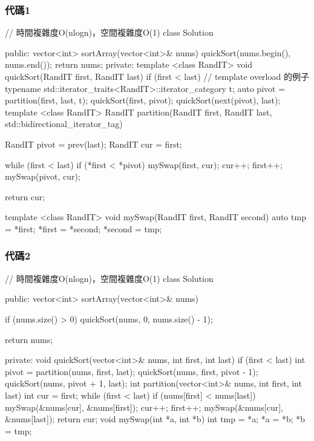\subsubsection{代碼1}
\begin{Code}
// 時間複雜度O(nlogn)，空間複雜度O(1)
class Solution {
public:
    vector<int> sortArray(vector<int>& nums) {
        quickSort(nums.begin(), nums.end());
        return nums;
    }
private:
    template <class RandIT>
        void quickSort(RandIT first, RandIT last)
    {
        if (first < last)
        {
            // template overload 的例子
            typename std::iterator_traits<RandIT>::iterator_category t;
            auto pivot = partition(first, last, t);
            quickSort(first, pivot);
            quickSort(next(pivot), last);
        }
    }
    template <class RandIT>
        RandIT partition(RandIT first, RandIT last, std::bidirectional_iterator_tag)
    {
        RandIT pivot = prev(last);
        RandIT cur = first;

        while (first < last)
        {
            if (*first < *pivot)
            {
                mySwap(first, cur);
                cur++;
            }
            first++;
        }
        mySwap(pivot, cur);

        return cur;
    }
    template <class RandIT>
        void mySwap(RandIT first, RandIT second)
    {
        auto tmp = *first;
        *first = *second;
        *second = tmp;
    }
}
\end{Code}

\subsubsection{代碼2}
\begin{Code}
// 時間複雜度O(nlogn)，空間複雜度O(1)
class Solution {
public:
    vector<int> sortArray(vector<int>& nums) {
        if (nums.size() > 0)
            quickSort(nums, 0, nums.size() - 1);

        return nums;
    }
private:
    void quickSort(vector<int>& nums, int first, int last)
    {
        if (first < last)
        {
            int pivot = partition(nums, first, last);
            quickSort(nums, first, pivot - 1);
            quickSort(nums, pivot + 1, last);
        }
    }
    int partition(vector<int>& nums, int first, int last)
    {
        int cur = first;
        while (first < last)
        {
            if (nums[first] < nums[last])
            {
                mySwap(&nums[cur], &nums[first]);
                cur++;
            }
            first++;
        }
        mySwap(&nums[cur], &nums[last]);
        return cur;
    }
    void mySwap(int *a, int *b)
    {
        int tmp = *a;
        *a = *b;
        *b = tmp;
    }
}
\end{Code}


